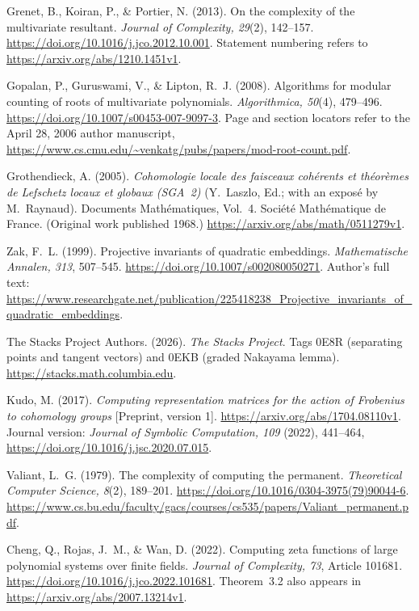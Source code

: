 Grenet, B., Koiran, P., \& Portier, N. (2013).
On the complexity of the multivariate resultant.
\emph{Journal of Complexity, 29}(2), 142--157.
\url{https://doi.org/10.1016/j.jco.2012.10.001}.
Statement numbering refers to \url{https://arxiv.org/abs/1210.1451v1}.

Gopalan, P., Guruswami, V., \& Lipton, R.~J. (2008).
Algorithms for modular counting of roots of multivariate polynomials.
\emph{Algorithmica, 50}(4), 479--496.
\url{https://doi.org/10.1007/s00453-007-9097-3}.
Page and section locators refer to the April 28, 2006 author manuscript,
\url{https://www.cs.cmu.edu/~venkatg/pubs/papers/mod-root-count.pdf}.

Grothendieck, A. (2005).
\emph{Cohomologie locale des faisceaux coh\'erents et th\'eor\`emes de
Lefschetz locaux et globaux (SGA~2)} (Y.~Laszlo, Ed.; with an expos\'e
by M.~Raynaud). Documents Math\'ematiques, Vol.~4.
Soci\'et\'e Math\'ematique de France. (Original work published 1968.)
\url{https://arxiv.org/abs/math/0511279v1}.

Zak, F.~L. (1999). Projective invariants of quadratic embeddings.
\emph{Mathematische Annalen, 313}, 507--545.
\url{https://doi.org/10.1007/s002080050271}.
Author's full text:
\url{https://www.researchgate.net/publication/225418238_Projective_invariants_of_quadratic_embeddings}.

The Stacks Project Authors. (2026). \emph{The Stacks Project}.
Tags 0E8R (separating points and tangent vectors) and 0EKB (graded
Nakayama lemma). \url{https://stacks.math.columbia.edu}.

Kudo, M. (2017). \emph{Computing representation matrices for the action
of Frobenius to cohomology groups} [Preprint, version 1].
\url{https://arxiv.org/abs/1704.08110v1}.
Journal version: \emph{Journal of Symbolic Computation, 109}
(2022), 441--464, \url{https://doi.org/10.1016/j.jsc.2020.07.015}.

Valiant, L.~G. (1979). The complexity of computing the permanent.
\emph{Theoretical Computer Science, 8}(2), 189--201.
\url{https://doi.org/10.1016/0304-3975(79)90044-6}.
\url{https://www.cs.bu.edu/faculty/gacs/courses/cs535/papers/Valiant_permanent.pdf}.

Cheng, Q., Rojas, J.~M., \& Wan, D. (2022).
Computing zeta functions of large polynomial systems over finite fields.
\emph{Journal of Complexity, 73}, Article 101681.
\url{https://doi.org/10.1016/j.jco.2022.101681}.
Theorem~3.2 also appears in \url{https://arxiv.org/abs/2007.13214v1}.

